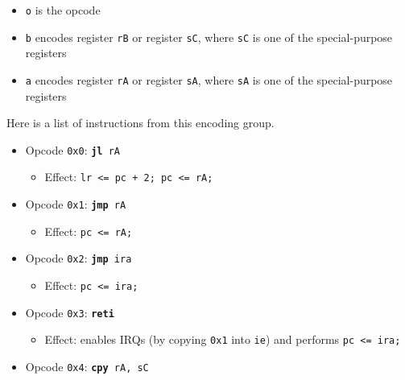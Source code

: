 \documentclass{article}
\begin{document}
	\singlespacing
	\begin{itemize}
	\item \texttt{o} is the opcode
	\item \texttt{b} encodes register \texttt{rB} or register
	\texttt{sC}, where \texttt{sC} is one of the special-purpose registers
	\item \texttt{a} encodes register \texttt{rA} or register
	\texttt{sA}, where \texttt{sA} is one of the special-purpose registers
	\end{itemize}
	\doublespacing

	Here is a list of instructions from this encoding group.

	\singlespacing
	\begin{itemize}
	\item Opcode \texttt{0x0}:
		\texttt{\textbf{jl} rA}
		\begin{itemize}
		\item Effect: \texttt{lr <= pc + 2; pc <= rA;}
		\end{itemize}
	\item Opcode \texttt{0x1}:
		\texttt{\textbf{jmp} rA}
		\begin{itemize}
		\item Effect: \texttt{pc <= rA;}
		\end{itemize}
	\item Opcode \texttt{0x2}:
		\texttt{\textbf{jmp} ira}
		\begin{itemize}
		\item Effect: \texttt{pc <= ira;}
		\end{itemize}
	\item Opcode \texttt{0x3}:
		\texttt{\textbf{reti}}
		\begin{itemize}
		\item Effect: enables IRQs (by copying \texttt{0x1} into
		\texttt{ie}) and performs \texttt{pc <= ira;}
		\end{itemize}
	\item Opcode \texttt{0x4}:
		\texttt{\textbf{cpy} rA, sC}
		\begin{itemize}

\end{itemize}
\end{itemize}
\end{document}
